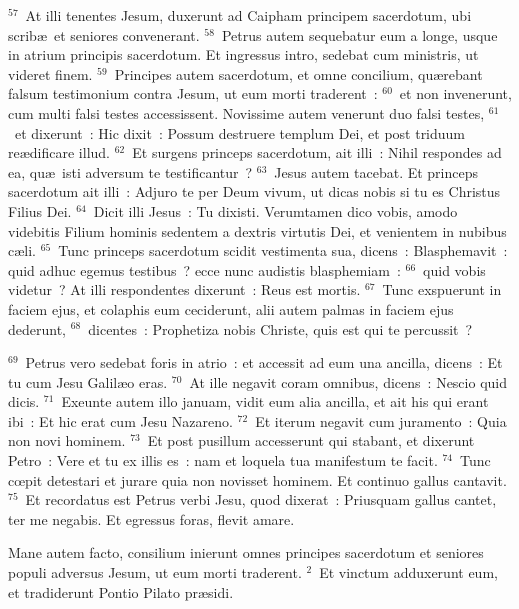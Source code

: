 ${}^{57}$~At illi tenentes Jesum, duxerunt ad Caipham principem sacerdotum, ubi scrib\ae\ et seniores convenerant.
${}^{58}$~Petrus autem sequebatur eum a longe, usque in atrium principis sacerdotum. Et ingressus intro, sedebat cum ministris, ut videret finem.
${}^{59}$~Principes autem sacerdotum, et omne concilium, qu\ae rebant falsum testimonium contra Jesum, ut eum morti traderent~:
${}^{60}$~et non invenerunt, cum multi falsi testes accessissent. Novissime autem venerunt duo falsi testes,
${}^{61}$~et dixerunt~: Hic dixit~: Possum destruere templum Dei, et post triduum re\ae dificare illud.
${}^{62}$~Et surgens princeps sacerdotum, ait illi~: Nihil respondes ad ea, qu\ae\ isti adversum te testificantur~?
${}^{63}$~Jesus autem tacebat. Et princeps sacerdotum ait illi~: Adjuro te per Deum vivum, ut dicas nobis si tu es Christus Filius Dei.
${}^{64}$~Dicit illi Jesus~: Tu dixisti. Verumtamen dico vobis, amodo videbitis Filium hominis sedentem a dextris virtutis Dei, et venientem in nubibus c\ae li.
${}^{65}$~Tunc princeps sacerdotum scidit vestimenta sua, dicens~: Blasphemavit~: quid adhuc egemus testibus~? ecce nunc audistis blasphemiam~:
${}^{66}$~quid vobis videtur~? At illi respondentes dixerunt~: Reus est mortis.
${}^{67}$~Tunc exspuerunt in faciem ejus, et colaphis eum ceciderunt, alii autem palmas in faciem ejus dederunt,
${}^{68}$~dicentes~: Prophetiza nobis Christe, quis est qui te percussit~?


${}^{69}$~Petrus vero sedebat foris in atrio~: et accessit ad eum una ancilla, dicens~: Et tu cum Jesu Galil\ae o eras.
${}^{70}$~At ille negavit coram omnibus, dicens~: Nescio quid dicis.
${}^{71}$~Exeunte autem illo januam, vidit eum alia ancilla, et ait his qui erant ibi~: Et hic erat cum Jesu Nazareno.
${}^{72}$~Et iterum negavit cum juramento~: Quia non novi hominem.
${}^{73}$~Et post pusillum accesserunt qui stabant, et dixerunt Petro~: Vere et tu ex illis es~: nam et loquela tua manifestum te facit.
${}^{74}$~Tunc cœpit detestari et jurare quia non novisset hominem. Et continuo gallus cantavit.
${}^{75}$~Et recordatus est Petrus verbi Jesu, quod dixerat~: Priusquam gallus cantet, ter me negabis. Et egressus foras, flevit amare.

\lettrine[lines=10,image=true,loversize=0.05,lraise=-0.03]{M}{}ane autem facto, consilium inierunt omnes principes sacerdotum et seniores populi adversus Jesum, ut eum morti traderent.
${}^{2}$~Et vinctum adduxerunt eum, et tradiderunt Pontio Pilato pr\ae sidi.



